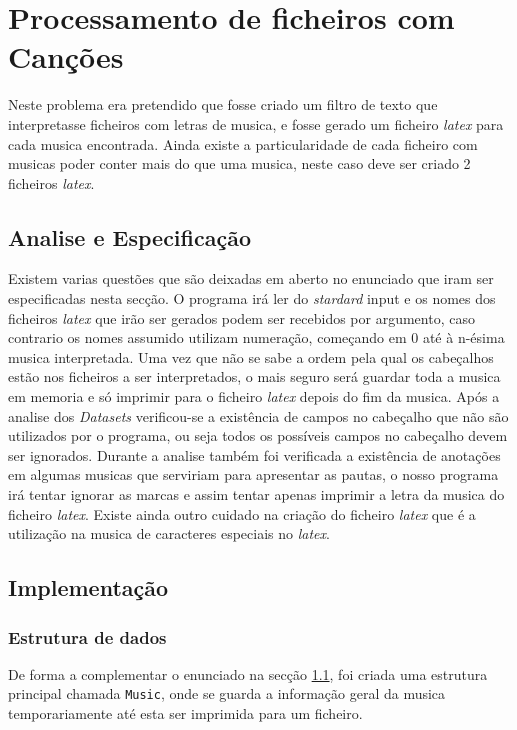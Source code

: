 \chapter{Processamento de ficheiros com Canções}
\label{cap:music}
Neste problema era pretendido que fosse criado um filtro de texto que interpretasse ficheiros com letras de musica, e fosse gerado um ficheiro \emph{latex} para cada musica encontrada.
Ainda existe a particularidade de cada ficheiro com musicas poder conter mais do que uma musica, neste caso deve ser criado 2 ficheiros \emph{latex}.

\section{Analise e Especificação}
\label{seq:music-ana}
Existem varias questões que são deixadas em aberto no enunciado que iram ser especificadas nesta secção. 
O programa irá ler do \emph{stardard} input e os nomes dos ficheiros \emph{latex} que irão ser gerados podem ser recebidos por argumento, caso contrario os nomes assumido utilizam numeração, começando em 0 até à n-ésima musica interpretada. 
Uma vez que não se sabe a ordem pela qual os cabeçalhos estão nos ficheiros a ser interpretados, o mais seguro será guardar toda a musica em memoria e só imprimir para o ficheiro \emph{latex} depois do fim da musica.
Após a analise dos \emph{Datasets} verificou-se a existência de campos no cabeçalho que não são utilizados por o programa, ou seja todos os possíveis campos no cabeçalho devem ser ignorados.
Durante a analise também foi verificada a existência de anotações em algumas musicas que serviriam para apresentar as pautas, o nosso programa irá tentar ignorar as marcas e assim tentar apenas imprimir a letra da musica do ficheiro \emph{latex}.
Existe ainda outro cuidado na criação do ficheiro \emph{latex} que é a utilização na musica de caracteres especiais no \emph{latex}.

\section{Implementação}
\label{seq:music-imp}

\subsection{Estrutura de dados}
\label{seq:music-est}
De forma a complementar o enunciado na secção \ref{seq:music-ana}, foi criada uma estrutura principal chamada \verb!Music!, onde se guarda a informação geral da musica temporariamente até esta ser imprimida para um ficheiro.

